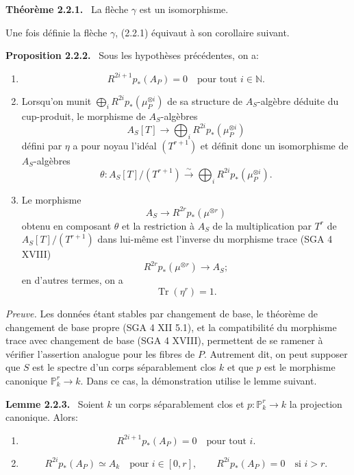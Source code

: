 \documentclass[11pt]{article}
\newenvironment{statement}[1]{\par\medskip\noindent\textbf{#1.}\ }{\par\medskip}
\begin{document}
\begin{statement}{Théorème 2.2.1}
La flèche $\gamma$ est un isomorphisme.
\end{statement}

Une fois définie la flèche $\gamma$, (2.2.1) équivaut à son corollaire suivant.

\begin{statement}{Proposition 2.2.2}
Sous les hypothèses précédentes, on a:
\begin{enumerate}[label=\alph*)]
\item
\[
R^{2i+1}p_*(A_P)=0\quad\text{pour tout }i\in\mathbb N.
\]
\item Lorsqu'on munit $\bigoplus_i R^{2i}p_*(\mu_P^{\otimes i})$ de sa structure de $A_S$-algèbre déduite du cup-produit, le morphisme de $A_S$-algèbres
\[
A_S[T]\longrightarrow \bigoplus_i R^{2i}p_*(\mu_P^{\otimes i})
\]
défini par $\eta$ a pour noyau l'idéal $(T^{r+1})$ et définit donc un isomorphisme de $A_S$-algèbres
\[
\theta:A_S[T]/(T^{r+1})\xrightarrow{\sim}\bigoplus_i R^{2i}p_*(\mu_P^{\otimes i}).
\]
\item Le morphisme
\[
A_S\longrightarrow R^{2r}p_*(\mu^{\otimes r})
\]
obtenu en composant $\theta$ et la restriction à $A_S$ de la multiplication par $T^r$ de $A_S[T]/(T^{r+1})$ dans lui-même est l'inverse du morphisme trace (SGA 4 XVIII)
\[
R^{2r}p_*(\mu^{\otimes r})\longrightarrow A_S;
\]
en d'autres termes, on a
\[
\operatorname{Tr}(\eta^r)=1.
\]
\end{enumerate}
\end{statement}

\emph{Preuve.} Les données étant stables par changement de base, le théorème de changement de base propre (SGA 4 XII 5.1), et la compatibilité du morphisme trace avec changement de base (SGA 4 XVIII), permettent de se ramener à vérifier l'assertion analogue pour les fibres de $P$. Autrement dit, on peut supposer que $S$ est le spectre d'un corps séparablement clos $k$ et que $p$ est le morphisme canonique $\mathbb P^r_k\to k$. Dans ce cas, la démonstration utilise le lemme suivant.

\begin{statement}{Lemme 2.2.3}
Soient $k$ un corps séparablement clos et $p:\mathbb P_k^r\to k$ la projection canonique. Alors:
\begin{enumerate}[label=\alph*)]
\item
\[
R^{2i+1}p_*(A_P)=0\quad\text{pour tout }i.
\]
\item
\[
R^{2i}p_*(A_P)\simeq A_k\quad\text{pour }i\in[0,r],
\qquad
R^{2i}p_*(A_P)=0\quad\text{si }i>r.
\]
\end{enumerate}
\end{statement}
\end{document}
